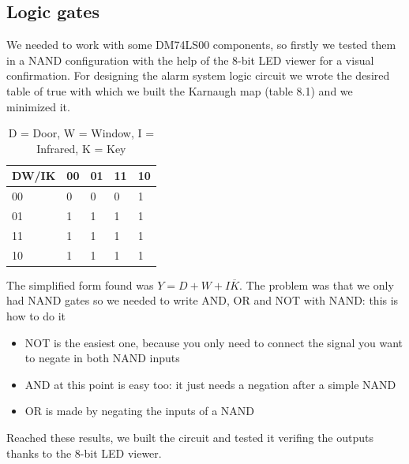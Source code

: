 \subsection{Logic gates}
We needed to work with some DM74LS00 components, so firstly we tested them in a NAND configuration with the help of the 8-bit LED viewer for a visual confirmation.
For designing the alarm system logic circuit we wrote the desired table of true with which we built the Karnaugh map (table 8.1) and we minimized it.

\begin{table}[H]
\centering
\label{my-label}
\begin{tabular}{lllll}
\hline
 DW/IK & 00 & 01 & 11 & 10 \\ \hline
 00    & 0  & 0  & 0  & 1 \\
 01    & 1  & 1  & 1  & 1 \\
 11    & 1  & 1  & 1  & 1 \\ 
 10    & 1  & 1  & 1  & 1 \\ \hline
\end{tabular}\caption{D = Door, W = Window, I = Infrared, K = Key}
\end{table}
The simplified form found was $Y = D + W + I\overline{K}$. The problem was that we only had NAND gates so we needed to write AND, OR and NOT with NAND: this is how to do it
\begin{itemize}
\item NOT is the easiest one, because you only need to connect the signal you want to negate in both NAND inputs
\item AND at this point is easy too: it just needs a negation after a simple NAND
\item OR is made by negating the inputs of a NAND
\end{itemize}
Reached these results, we built the circuit and tested it verifing the outputs thanks to the 8-bit LED viewer.

